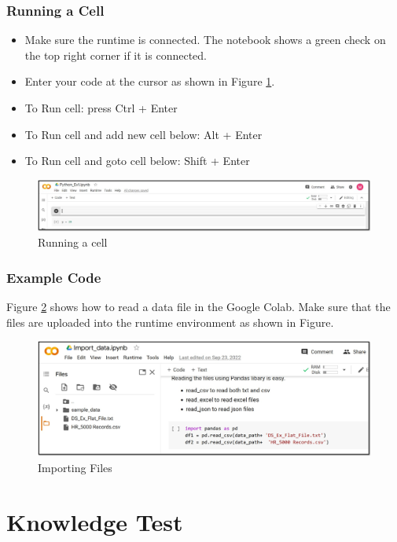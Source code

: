 \subsubsection{\textbf{Running a Cell}}
 \begin{itemize}
 \item Make sure the runtime is connected. The notebook shows a green check on the top right corner if it is connected.
 \item Enter your code at the cursor as shown in Figure \ref{fig:colab3}.
 \item To Run cell: press Ctrl + Enter
 \item To Run cell and add new cell below: Alt + Enter
 \item To Run cell and goto cell below: Shift + Enter
 \end{itemize}
 \begin{figure}[h]
  \centering
  \includegraphics[width=8 cm]{colab3.jpg}
  \caption{Running a cell}
  \label{fig:colab3}
\end{figure}
\newpage
\subsubsection{\textbf{Example Code}}
Figure \ref{fig:import} shows how to read a data file in the Google Colab. Make sure that the files are uploaded into the runtime environment as shown in Figure.
 \begin{figure}[h]
  \centering
  \includegraphics[width=8 cm]{import.jpg}
  \caption{Importing Files}
  \label{fig:import}
\end{figure}
\newpage
\section{Knowledge Test}
